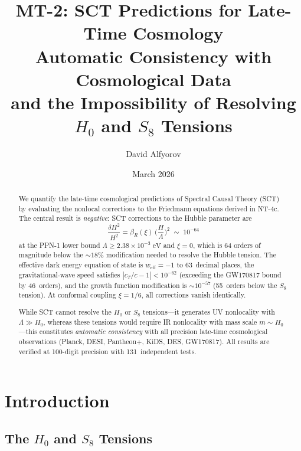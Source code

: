 \documentclass[11pt,a4paper]{article}
\title{MT-2: SCT Predictions for Late-Time Cosmology\\[6pt]
\large Automatic Consistency with Cosmological Data\\
and the Impossibility of Resolving $H_0$ and $S_8$ Tensions}
\author{David Alfyorov}
\date{March 2026}
\newcommand{\Lam}{\Lambda}
\theoremstyle{plain}
\theoremstyle{definition}
\begin{document}
\maketitle

\begin{center}
\end{center}

\begin{abstract}
We quantify the late-time cosmological predictions of Spectral Causal Theory
(SCT) by evaluating the nonlocal corrections to the Friedmann equations
derived in NT-4c. The central result is \emph{negative}: SCT corrections
to the Hubble parameter are
\begin{equation*}
  \frac{\delta H^2}{H^2}
  = \beta_R(\xi)\,\biggl(\frac{H}{\Lam}\biggr)^{\!2}
  \;\sim\; 10^{-64}
\end{equation*}
at the PPN-1 lower bound $\Lam \geq 2.38 \times 10^{-3}\;\mathrm{eV}$
and $\xi = 0$, which is 64 orders of magnitude below the ${\sim}18\%$
modification needed to resolve the Hubble tension. The effective dark
energy equation of state is $w_{\mathrm{eff}} = -1$ to 63~decimal places,
the gravitational-wave speed satisfies $|c_T/c - 1| < 10^{-62}$
(exceeding the GW170817 bound by 46~orders), and the growth function
modification is ${\sim}10^{-57}$ (55~orders below the $S_8$ tension).
At conformal coupling $\xi = 1/6$, all corrections vanish identically.

While SCT cannot resolve the $H_0$ or $S_8$ tensions---it generates UV
nonlocality with $\Lam \gg H_0$, whereas these tensions would require IR
nonlocality with mass scale $m \sim H_0$---this constitutes
\emph{automatic consistency} with all precision late-time cosmological
observations (Planck, DESI, Pantheon+, KiDS, DES, GW170817).
All results are verified at 100-digit precision with 131~independent
tests.
\end{abstract}

\tableofcontents
\newpage

\section{Introduction}\label{sec:intro}

\subsection{The $H_0$ and $S_8$ Tensions}
\end{document}
